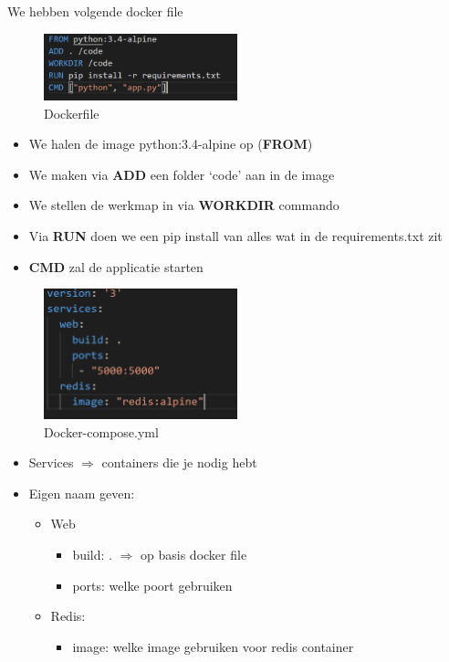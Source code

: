 \documentclass{article}
\newcommand{\bold}[1]{\textbf{#1}}
\begin{document}
We hebben volgende docker file

\begin{figure}[H]
    \centering
    \includegraphics[width=0.5\textwidth]{docker-compose-1.png}
    \caption{Dockerfile}
\end{figure}

\begin{itemize}
    \item We halen de image python:3.4-alpine op (\bold{FROM})
    \item We maken via \bold{ADD} een folder `code' aan in de image
    \item We stellen de werkmap in via \bold{WORKDIR} commando
    \item Via \bold{RUN} doen we een pip install van alles wat in de requirements.txt zit
    \item \bold{CMD} zal de applicatie starten
\end{itemize}

\begin{figure}[H]
    \centering
    \includegraphics[width=0.5\textwidth]{docker-compose-2.png}
    \caption{Docker-compose.yml}
\end{figure}

\begin{itemize}
    \item Services $\Rightarrow$ containers die je nodig hebt
    \item Eigen naam geven:
    \begin{itemize}
        \item Web
        \begin{itemize}
            \item build: . $\Rightarrow$ op basis docker file
            \item ports: welke poort gebruiken
        \end{itemize}
        \item Redis:
        \begin{itemize}
            \item image: welke image gebruiken voor redis container
        \end{itemize}
    \end{itemize}
\end{itemize}
\end{document}
